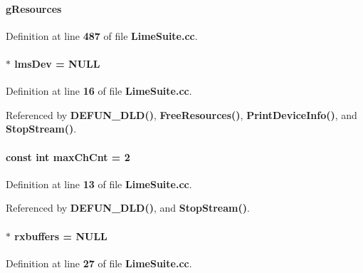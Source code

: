 \paragraph[{g\+Resources}]{ g\+Resources}\label{LimeSuite_8cc_a706c66226c59ad0b9600d04cd0b55eb4}


Definition at line {\bf 487} of file {\bf Lime\+Suite.\+cc}.

\paragraph[{lms\+Dev}]{$\ast$ lms\+Dev = N\+U\+LL}\label{LimeSuite_8cc_a84e0218009f9f62d338a67e37c690032}


Definition at line {\bf 16} of file {\bf Lime\+Suite.\+cc}.



Referenced by {\bf D\+E\+F\+U\+N\+\_\+\+D\+L\+D()}, {\bf Free\+Resources()}, {\bf Print\+Device\+Info()}, and {\bf Stop\+Stream()}.

\paragraph[{max\+Ch\+Cnt}]{\setlength{\rightskip}{0pt plus 5cm}const {\bf int} max\+Ch\+Cnt = 2}\label{LimeSuite_8cc_a43aa0299f3616688ee23658212705a56}


Definition at line {\bf 13} of file {\bf Lime\+Suite.\+cc}.



Referenced by {\bf D\+E\+F\+U\+N\+\_\+\+D\+L\+D()}, and {\bf Stop\+Stream()}.

\paragraph[{rxbuffers}]{$\ast$ rxbuffers = N\+U\+LL}\label{LimeSuite_8cc_a76d82923ef282f50de352ddfbf5ff91f}


Definition at line {\bf 27} of file {\bf Lime\+Suite.\+cc}.



